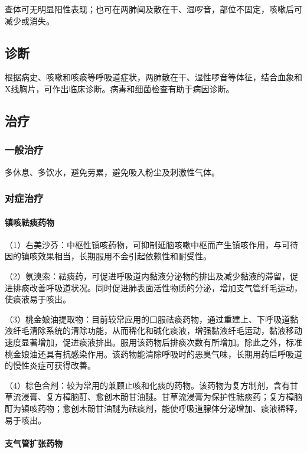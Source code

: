查体可无明显阳性表现；也可在两肺闻及散在干、湿啰音，部位不固定，咳嗽后可减少或消失。

\subsection{诊断}

根据病史、咳嗽和咳痰等呼吸道症状，两肺散在干、湿性啰音等体征，结合血象和X线胸片，可作出临床诊断。病毒和细菌检查有助于病因诊断。

\subsection{治疗}

\subsubsection{一般治疗}

多休息、多饮水，避免劳累，避免吸入粉尘及刺激性气体。

\subsubsection{对症治疗}
\paragraph{镇咳祛痰药物}

（1）右美沙芬：中枢性镇咳药物，可抑制延脑咳嗽中枢而产生镇咳作用，与可待因的镇咳效果相当，长期服用不会引起依赖性和耐受性。

（2）氨溴索：祛痰药，可促进呼吸道内黏液分泌物的排出及减少黏液的滞留，促进排痰改善呼吸道状况。同时促进肺表面活性物质的分泌，增加支气管纤毛运动，使痰液易于咳出。

（3）桃金娘油提取物：目前较常应用的口服祛痰药物，通过重建上、下呼吸道黏液纤毛清除系统的清除功能，从而稀化和碱化痰液，增强黏液纤毛运动，黏液移动速度显著增加，促进痰液排出。服用该药物后排痰次数有所增加。除此之外，标准桃金娘油还具有抗感染作用。该药物能清除呼吸时的恶臭气味，长期用药后呼吸道的慢性炎症可获得改善。

（4）棕色合剂：较为常用的兼顾止咳和化痰的药物。该药物为复方制剂，含有甘草流浸膏、复方樟脑酊、愈创木酚甘油醚。甘草流浸膏为保护性祛痰药；复方樟脑酊为镇咳药物；愈创木酚甘油醚为祛痰剂，能使呼吸道腺体分泌增加、痰液稀释，易于咳出。
\paragraph{支气管扩张药物}

